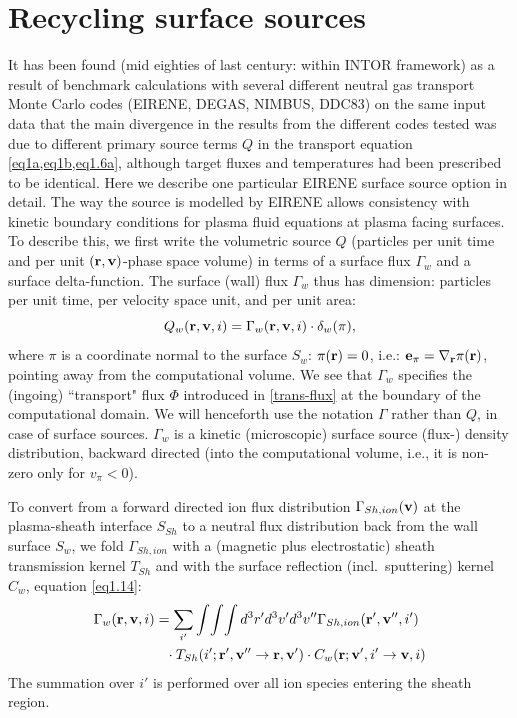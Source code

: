 \newpage

\section{Recycling surface sources} \label{sec1.4}

It has been found (mid eighties of last century: within INTOR framework) as a
result of benchmark calculations with several different neutral gas transport
Monte Carlo codes (EIRENE, DEGAS, NIMBUS, DDC83) on the same input data that
the main divergence in the results from the different codes tested was due to
different primary source terms $Q$ in the transport equation
\cref{eq1a,eq1b,eq1.6a}, although target fluxes and temperatures had been
prescribed to be identical.
Here we describe one particular EIRENE surface source option in detail.
The way the source is modelled by EIRENE allows  consistency with kinetic
boundary conditions for plasma fluid equations at plasma facing surfaces.
To describe this, we first write the volumetric source $Q$ (particles per unit
time and per unit $(\mathbf{r},\mathbf{v})$-phase space volume) in terms of a  surface flux
$\Gamma_w$ and a surface delta-function.
The surface (wall) flux $\Gamma_w$ thus has dimension: particles per unit time,
per velocity space unit, and per unit area:
\begin{equation}
  Q_w( \mathbf{r}, \mathbf{v}, i ) = \Gamma_w ( \mathbf{r}, \mathbf{v}, i )	 \cdot	 \delta_w ( \pi ),
  \label{eq1.22}
\end{equation}
where $\pi$ is a coordinate normal to the surface
$S_w$:
$\pi(\mathbf{r})=0 $, i.e.: $\mathbf{e}_{\pi} = \nabla_{\mathbf{r}}\pi(\mathbf{r})$, pointing away from the
computational volume.
We see that $\Gamma_w$ specifies the (ingoing) ``transport" flux $\Phi$
introduced in \cref{trans-flux} at the boundary of the computational domain.
We will henceforth use the notation $\Gamma$ rather than $Q$, in case of
surface sources.
$\Gamma_w$ is a kinetic (microscopic) surface source (flux-) density
distribution, backward directed (into the computational volume, i.e., it is
non-zero only for $v_\pi < 0$).

To convert from a forward directed ion flux distribution $\Gamma_{Sh,ion}(\mathbf{v})$
at the plasma-sheath interface $S_{Sh}$ to a neutral flux distribution back
from the wall surface $S_w$, we fold $\Gamma_{Sh,ion}$ with a (magnetic plus
electrostatic) sheath transmission kernel $T_{Sh}$ and with the surface
reflection (incl.\ sputtering) kernel $C_w$, equation \cref{eq1.14}:
\begin{align}
  \Gamma_w ( \mathbf{r}, \mathbf{v}, i ) & = \sum_{i '}
  \int\! \int\! \int d^3 r' d^3 v'  d^3
  v'' \Gamma_{Sh,ion}
  ( \mathbf{r} ', \mathbf{v} '', i ' ) \nonumber                    \\
                           & \phantom{=} \cdot T_{Sh}
  (i ' ; \mathbf{r} ', \mathbf{v} '' \rightarrow \mathbf{r}, \mathbf{v}  ' ) \cdot	C_w ( \mathbf{r} ; \mathbf{v} ', i '
  \rightarrow \mathbf{v}, i ) \label{eq1.24}
\end{align}
The summation over $i '$ is
performed over all ion species entering the sheath region.

